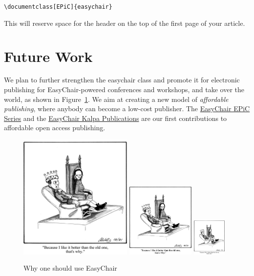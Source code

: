 \documentclass{easychair}
\newcommand{\easychair}{\textsf{easychair}}
\begin{document}
\small
\begin{verbatim}
\documentclass[EPiC]{easychair}
\end{verbatim}
\normalsize
This will reserve space for the header on the top of the first page of your
article. 

\section{Future Work}
\label{sect:future-work}

We plan to further strengthen the {\easychair} class and promote it for 
electronic publishing for EasyChair-powered conferences and workshops,
and take over the world, as shown in Figure~\ref{fig:easythrone}. We
aim at creating a new model of \emph{affordable publishing}, where
anybody can become a low-cost publisher. The
\href{http://www.easychair.org/publications/EPiC}{EasyChair EPiC
  Series} and
the
\href{http://www.easychair.org/publications/Kalpa}{EasyChair Kalpa Publications} 
are our first contributions to affordable open access publishing.

\begin{figure}[tb]
  \begin{centering}
    \includegraphics[width=0.5\textwidth]{throneEC.jpg}
    \includegraphics[width=0.3\textwidth]{throneEC.jpg}
    \includegraphics[width=0.15\textwidth]{throneEC.jpg}
  \end{centering}
  \caption{Why one should use EasyChair}
  \label{fig:easythrone}
\end{figure}
\end{document}

